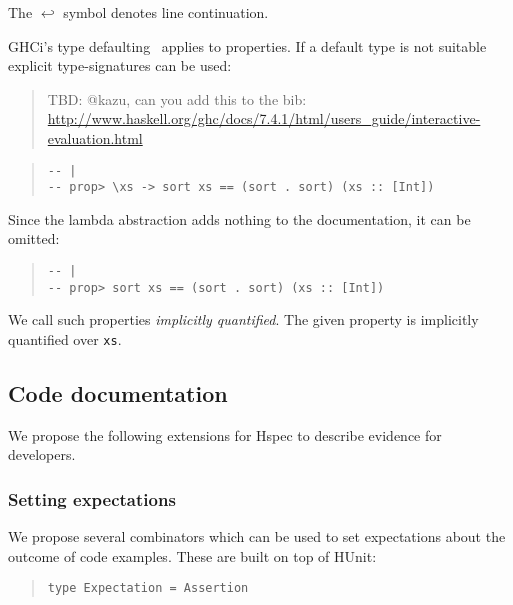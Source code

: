 \documentclass[preprint]{sigplanconf}
\begin{document}
\noindent The $\hookleftarrow$ symbol denotes line continuation.

GHCi's type defaulting~\cite{ghc-manual} applies to properties.  If a default type is
not suitable explicit type-signatures can be used:

\begin{quote}
    TBD: @kazu, can you add this to the bib:
    \url{http://www.haskell.org/ghc/docs/7.4.1/html/users_guide/interactive-evaluation.html}
\end{quote}

\begin{quote}
\small
\begin{verbatim}
-- |
-- prop> \xs -> sort xs == (sort . sort) (xs :: [Int])
\end{verbatim}
\end{quote}

\noindent Since the lambda abstraction adds nothing to the
documentation, it can be omitted:

\begin{quote}
\small
\begin{verbatim}
-- |
-- prop> sort xs == (sort . sort) (xs :: [Int])
\end{verbatim}
\end{quote}

\noindent We call such properties \emph{implicitly quantified}.  The
given property is implicitly quantified over {\tt xs}.

\subsection{Code documentation}
\label{sec:code-doc}

We propose the following extensions for Hspec to
describe evidence for developers.

\subsubsection{Setting expectations}

We propose several combinators which can be used to set expectations
about the outcome of code examples.  These are built on top of HUnit:

\begin{quote}
\small
\begin{verbatim}
type Expectation = Assertion
\end{verbatim}
\end{quote}
\end{document}
